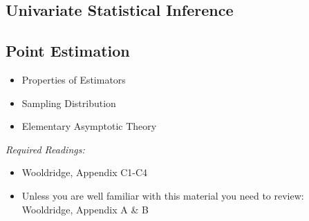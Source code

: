 \documentclass[PS]{syllabus}
\begin{document}
\begin{syllabus}
%
%


\section{Univariate Statistical Inference}
\subsection{Point Estimation}
\begin{itemize}
   \item Properties of Estimators
   \item Sampling Distribution
   \item Elementary Asymptotic Theory
\end{itemize}
\textit{Required Readings:}
\begin{itemize}
  \item Wooldridge, Appendix C1-C4
  \item Unless you are well familiar with this material you need to review: Wooldridge, Appendix A \& B
\end{itemize}


\end{syllabus}
\end{document}

